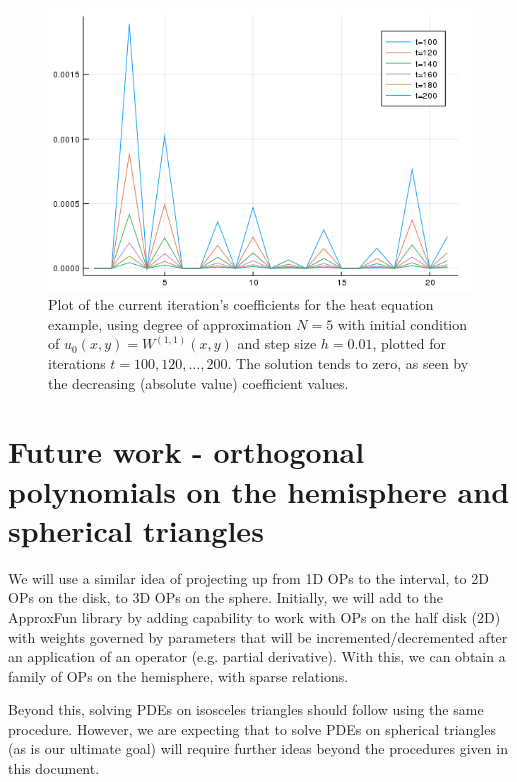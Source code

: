 \documentclass[11pt, oneside]{article}   	%
\newcommand{\Wii}{W^{(1,1)}}
\begin{document}
\begin{figure}
	\includegraphics[scale=0.4]{example2timesteppingcovnvergence}
\centering
\caption{Plot of the current iteration's coefficients for the heat equation example, using degree of approximation $N = 5$ with initial condition of $u_0(x,y) = \Wii(x,y)$ and step size $h=0.01$, plotted for iterations $t=100, 120, \dots, 200$. The solution tends to zero, as seen by the decreasing (absolute value) coefficient values.}
\centering
\label{fig:heateqn}
\end{figure}



%
\section{Future work - orthogonal polynomials on the hemisphere and spherical triangles}

We will use a similar idea of projecting up from 1D OPs to the interval, to 2D OPs on the disk, to 3D OPs on the sphere. Initially, we will add to the ApproxFun library by adding capability to work with OPs on the half disk (2D) with weights governed by parameters that will be incremented/decremented after an application of an operator (e.g. partial derivative). With this, we can obtain a family of OPs on the hemisphere, with sparse relations.

Beyond this, solving PDEs on isosceles triangles should follow using the same procedure. However, we are expecting that to solve PDEs on spherical triangles (as is our ultimate goal) will require further ideas beyond the procedures given in this document.



\end{document}
